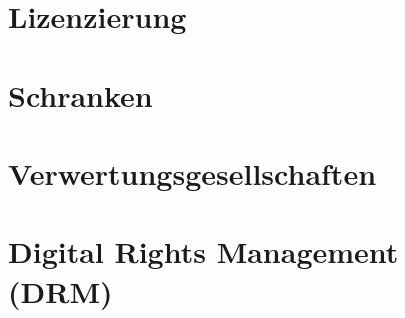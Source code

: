 \documentclass{article}
\begin{document}
\section{Lizenzierung}


\section{Schranken}


\section{Verwertungsgesellschaften}


\section{Digital Rights Management (DRM)}
\end{document}
